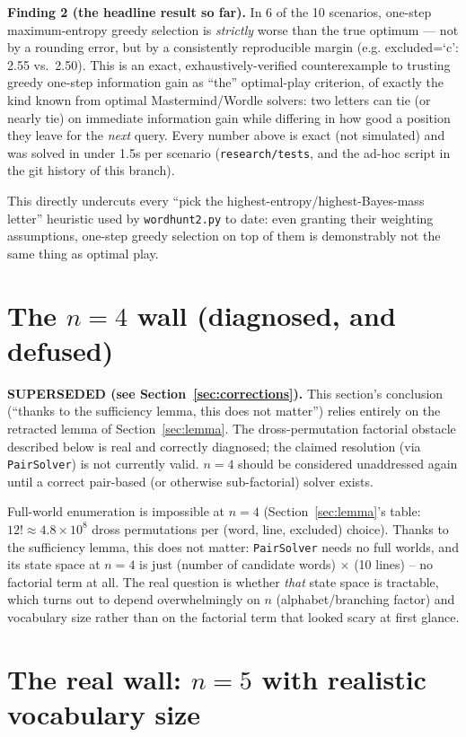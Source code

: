 \documentclass[11pt]{article}
\begin{document}
\textbf{Finding 2 (the headline result so far).} In 6 of the 10
scenarios, one-step maximum-entropy greedy selection is \emph{strictly}
worse than the true optimum --- not by a rounding error, but by a
consistently reproducible margin (e.g. excluded=`c': 2.55 vs.\ 2.50). This
is an exact, exhaustively-verified counterexample to trusting greedy
one-step information gain as ``the'' optimal-play criterion, of exactly the
kind known from optimal Mastermind/Wordle solvers: two letters can tie (or
nearly tie) on immediate information gain while differing in how good a
position they leave for the \emph{next} query. Every number above is
exact (not simulated) and was solved in under 1.5s per scenario
(\texttt{research/tests}, and the ad-hoc script in the git history of this
branch).

This directly undercuts every ``pick the highest-entropy/highest-Bayes-mass
letter'' heuristic used by \texttt{wordhunt2.py} to date: even granting
their weighting assumptions, one-step greedy selection on top of them is
demonstrably not the same thing as optimal play.

\section{The $n=4$ wall (diagnosed, and defused)}
\label{sec:n4wall}

\textbf{SUPERSEDED (see Section~\ref{sec:corrections}).} This section's
conclusion (``thanks to the sufficiency lemma, this does not matter'')
relies entirely on the retracted lemma of Section~\ref{sec:lemma}. The
dross-permutation factorial obstacle described below is real and correctly
diagnosed; the claimed resolution (via \texttt{PairSolver}) is not
currently valid. $n=4$ should be considered unaddressed again until a
correct pair-based (or otherwise sub-factorial) solver exists.

Full-world enumeration is impossible at $n=4$ (Section~\ref{sec:lemma}'s
table: $12! \approx 4.8\times10^8$ dross permutations per (word, line,
excluded) choice). Thanks to the sufficiency lemma, this does not matter:
\texttt{PairSolver} needs no full worlds, and its state space at $n=4$ is
just (number of candidate words) $\times$ (10 lines) -- no factorial term
at all. The real question is whether \emph{that} state space is tractable,
which turns out to depend overwhelmingly on $n$ (alphabet/branching factor)
and vocabulary size rather than on the factorial term that looked scary at
first glance.

\section{The real wall: $n=5$ with realistic vocabulary size}
\label{sec:n5wall}
\end{document}
